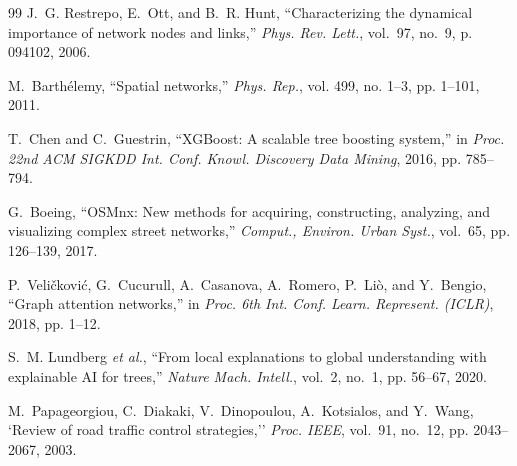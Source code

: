 \documentclass[journal]{IEEEtran}
\begin{document}
\begin{thebibliography}{99}
J.~G. Restrepo, E.~Ott, and B.~R. Hunt, ``Characterizing the dynamical importance of network nodes and links,'' \emph{Phys. Rev. Lett.}, vol.~97, no.~9, p. 094102, 2006.

M.~Barth\'elemy, ``Spatial networks,'' \emph{Phys. Rep.}, vol. 499, no. 1--3, pp. 1--101, 2011.

T.~Chen and C.~Guestrin, ``{XGBoost}: A scalable tree boosting system,'' in \emph{Proc. 22nd ACM SIGKDD Int. Conf. Knowl. Discovery Data Mining}, 2016, pp. 785--794.

G.~Boeing, ``{OSMnx}: New methods for acquiring, constructing, analyzing, and visualizing complex street networks,'' \emph{Comput., Environ. Urban Syst.}, vol.~65, pp. 126--139, 2017.

P.~Veli\v{c}kovi\'c, G.~Cucurull, A.~Casanova, A.~Romero, P.~Li\`o, and Y.~Bengio, ``Graph attention networks,'' in \emph{Proc. 6th Int. Conf. Learn. Represent. (ICLR)}, 2018, pp. 1--12.

S.~M. Lundberg \emph{et al.}, ``From local explanations to global understanding with explainable {AI} for trees,'' \emph{Nature Mach. Intell.}, vol.~2, no.~1, pp. 56--67, 2020.

M.~Papageorgiou, C.~Diakaki, V.~Dinopoulou, A.~Kotsialos, and Y.~Wang, `Review of road traffic control strategies,'' \emph{Proc. IEEE}, vol.~91, no.~12, pp. 2043--2067, 2003.

\end{thebibliography}
\end{document}
